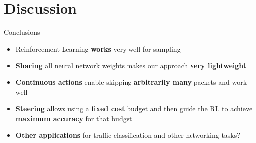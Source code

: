 \documentclass[xcolor={dvipsnames}]{beamer}
\begin{document}
\section{Discussion}
\begin{frame}{Conclusions}
\begin{itemize}
\item Reinforcement Learning \textbf{works} very well for sampling
\item \textbf{Sharing} all neural network weights makes our approach \textbf{very lightweight}
\item \textbf{Continuous actions} enable skipping \textbf{arbitrarily many} packets and work well
\item \textbf{Steering} allows using a \textbf{fixed cost} budget and then guide the RL to achieve \textbf{maximum accuracy} for that budget
\item \textbf{Other applications} for traffic classification and other networking tasks?
\end{itemize}
\end{frame}

\makelastslide
\end{document}
